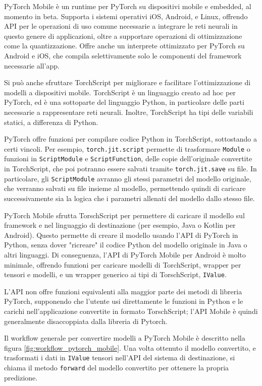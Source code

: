 PyTorch Mobile è un runtime per PyTorch su dispositivi mobile e embedded, al momento in
beta. Supporta i sistemi operativi iOS, Android, e Linux, offrendo API per le operazioni
di uso comune necessarie a integrare le reti neurali in questo genere di applicazioni,
oltre a supportare operazioni di ottimizzazione come la quantizzazione. Offre anche 
un interprete ottimizzato per PyTorch su Android e iOS, che compila selettivamente solo
le componenti del framework necessarie all'app.

Si può anche sfruttare TorchScript per migliorare e facilitare l'ottimizzazione di modelli
a dispositivi mobile. TorchScript è un linguaggio creato ad hoc per PyTorch, ed è una 
sottoparte del linguaggio Python, in particolare delle parti necessarie a rappresentare reti 
neurali. Inoltre, TorchScript ha tipi delle variabili statici, a differenza di Python.

PyTorch offre funzioni per compilare codice Python in TorchScript, sottostando a certi
vincoli. Per esempio, \texttt{torch.jit.script} permette di trasformare \texttt{Module}
o funzioni in \texttt{ScriptModule} e \texttt{ScriptFunction}, delle copie dell'originale
convertite in TorchScript, che poi potranno essere salvati tramite \texttt{torch.jit.save}
su file. In particolare, gli \texttt{ScriptModule} avranno gli stessi parametri del modello
originale, che verranno salvati su file insieme al modello, permettendo quindi di caricare
successivamente sia la logica che i parametri allenati del modello dallo stesso file.

PyTorch Mobile sfrutta TorschScript per permettere di caricare il modello sul framework 
e nel linguaggio di destinazione (per esempio, Java o Kotlin per Android). Questo permette
di creare il modello usando l'API di PyTorch in Python, senza dover "ricreare" il codice
Python del modello originale in Java o altri linguaggi. Di conseguenza, l'API di PyTorch 
Mobile per Android è molto minimale, offrendo funzioni per caricare modelli di TorchScript, 
wrapper per tensori e modelli, e un wrapper generico ai tipi di TorschScript, \texttt{IValue}.

L'API non offre funzioni equivalenti alla maggior parte dei metodi di libreria PyTorch, 
supponendo che l'utente usi direttamente le funzioni in Python e le carichi nell'applicazione
convertite in formato TorschScript; l'API Mobile è quindi generalmente disaccoppiata dalla
libreria di Pytorch.

Il workflow generale per convertire modelli a PyTorch Mobile è descritto nella figura 
\ref{fig:workflow_pytorch_mobile}. Una volta ottenuto il modello convertito, e trasformati
i dati in \texttt{IValue} tensori nell'API del sistema di destinazione, si chiama il metodo
\texttt{forward} del modello convertito per ottenere la propria predizione.

